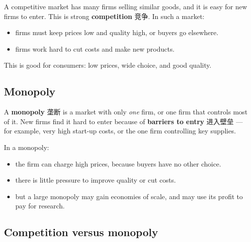 \documentclass[11pt]{article}
\begin{document}
A competitive market has many firms selling similar goods, and it is easy for new firms to enter. This is strong \textbf{competition} 竞争. In such a market:

\begin{itemize}
\item firms must keep prices low and quality high, or buyers go elsewhere.

\item firms work hard to cut costs and make new products.

\end{itemize}

This is good for consumers: low prices, wide choice, and good quality.

\subsection*{Monopoly}

A \textbf{monopoly} 垄断 is a market with only \emph{one} firm, or one firm that controls most of it. New firms find it hard to enter because of \textbf{barriers to entry} 进入壁垒 — for example, very high start-up costs, or the one firm controlling key supplies.

In a monopoly:

\begin{itemize}
\item the firm can charge high prices, because buyers have no other choice.

\item there is little pressure to improve quality or cut costs.

\item but a large monopoly may gain economies of scale, and may use its profit to pay for research.

\end{itemize}

\subsection*{Competition versus monopoly}

\begin{center}
\end{center}
\end{document}
